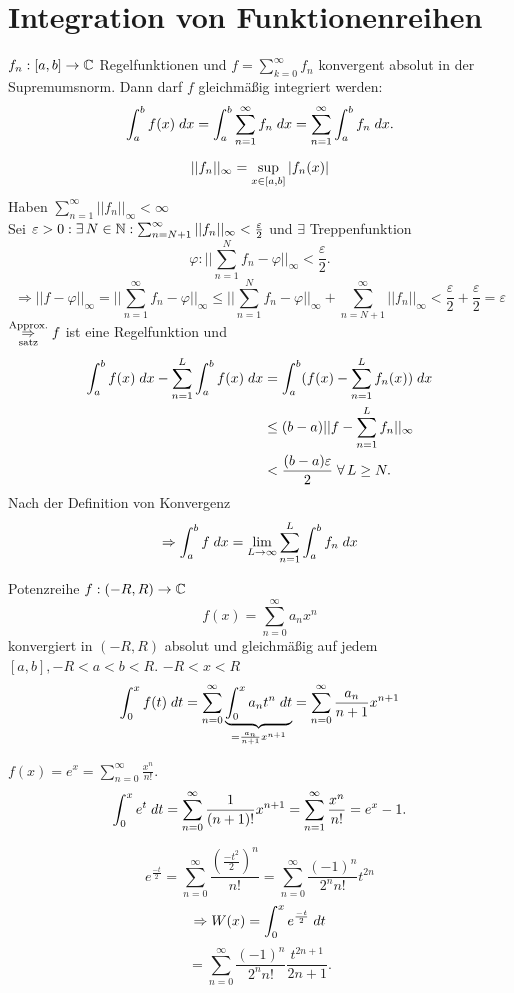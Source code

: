 \documentclass[../ana2.tex]{subfiles}
\begin{document}
\setcounter{section}{6}
\section{Integration von Funktionenreihen}
\begin{satz}
    \( \abb{f_n}{[a,b]}{\C} \) Regelfunktionen 
    und \( f = \sum_{k=0}^\infty f_n \) konvergent 
    absolut in der Supremumsnorm. Dann darf \(f\) 
    gleichmäßig integriert werden:
    \[ \integral{f(x)}{a}{b} 
    = \integral{\sum_{n=1}^\infty f_n}{a}{b}
    = \sum_{n=1}^\infty \integral{f_n}{a}{b}. \]
\end{satz}
\begin{bew}
    \[ ||f_n||_\infty 
    = \underset{x\in[a,b]}{\sup} \abs{f_n(x)} \]
    Haben \( \sum_{n=1}^\infty ||f_n||_\infty < \infty \) \\
    Sei \(\varepsilon > 0: \exists N \in \N: 
    \sum_{n=N+1}^\infty ||f_n||_\infty < \frac{\varepsilon}{2}\)
    und \( \exists \) Treppenfunktion 
    \[ \varphi : ||\sum_{n=1}^N f_n - \varphi ||_\infty 
    < \frac{\varepsilon}{2}. \]
    \[ \Rightarrow ||f-\varphi||_\infty 
    = ||\sum_{n=1}^\infty f_n - \varphi||_\infty 
    \leq || \sum_{n=1}^N f_n - \varphi||_\infty 
    + \sum_{n=N+1}^\infty ||f_n||_\infty < \frac{\varepsilon}{2}
    + \frac{\varepsilon}{2} = \varepsilon \]    
    \( \overundersett{Approx.}{satz}{\Rightarrow} f \)
    ist eine Regelfunktion und 
    \begin{align*}
        \integral{f(x)}{a}{b} - \sum_{n=1}^L 
        \integral{f(x)}{a}{b}
        &= \integral{(f(x) - \sum_{n=1}^L f_n(x))}{a}{b}\\
        &\leq (b-a) ||f - \sum_{n=1}^L f_n ||_\infty \\
        &< \frac{(b-a)\varepsilon}{2} \;\forall L \geq N.
    \end{align*}
    Nach der Definition von Konvergenz 
    \[ \Rightarrow \integral{f}{a}{b} = \limes{L} 
    \sum_{n=1}^L \integral{f_n}{a}{b} \]
\end{bew}
\begin{bsp}
    Potenzreihe \( f: (-R, R) \rightarrow \C \)
    \[ f(x) = \sum_{n=0}^\infty a_n x^n \]
    konvergiert in \( (-R, R) \) absolut und gleichmäßig 
    auf jedem \( [a,b], -R < a < b < R \).
    \( -R < x < R \)
    \[ \integralx{f(t)}{0}{x}{t} = 
    \sum_{n=0}^\infty \underbrace{\integralx{a_n t^n}{0}{x}{t}}
    _{=\frac{a_n}{n+1}x^{n+1}}
    = \sum_{n=0}^\infty \frac{a_n}{n+1} x^{n+1}\]
    
\end{bsp}
\begin{bsp}
    \( f(x) = e^x = \sum_{n=0}^\infty 
    \frac{x^n}{n!} \).
    \[ \integralx{e^t}{0}{x}{t}
    = \sum_{n=0}^\infty \frac{1}{(n+1)!} x^{n+1} 
    = \sum_{n=1}^\infty \frac{x^n}{n!} 
    = e^x - 1. \]
\end{bsp}
\begin{bsp}
    \[ e^{\frac{-t}{2}} = \sum_{n=0}^\infty 
    \frac{(\frac{-t^2}{2})^n}{n!} 
    = \sum_{n=0}^\infty \frac{(-1)^n}{2^n n!} t^{2n} \]
    \[ \Rightarrow W(x) = \integralx{e^{\frac{-t}{2}}}{0}{x}{t} \]
    \[ = \sum_{n=0}^\infty \frac{(-1)^n}{2^n n!} 
    \frac{t^{2n+1}}{2n+1}. \]

\end{bsp}
\end{document}

